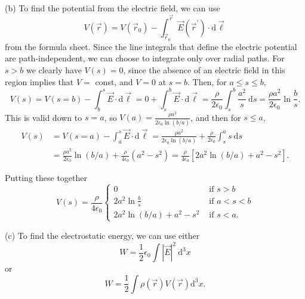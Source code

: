 \documentclass[12pt]{article}
\begin{document}
(b) To find the potential from the electric field, we can use
\[
V(\vec{r})=V\left(\vec{r}_0\right)-\int_{\vec{r}_0}^{\vec{r}} \vec{E}\left(\vec{r}^{\prime}\right) \cdot \mathrm{d} \vec{\ell}
\]
from the formula sheet. Since the line integrals that define the electric potential are path-independent, we can choose to integrate only over radial paths. For \(s>b\) we clearly have \(V(s)=0\), since the absence of an electric field in this region implies that \(V=\) const, and \(V=0\) at \(s=b\). Then, for \(a \leq s \leq b\),
\[
V(s)=V(s=b)-\int_b^s \vec{E} \cdot \mathrm{d} \vec{\ell}=0+\int_s^b \vec{E} \cdot \mathrm{d} \vec{\ell}=\frac{\rho}{2 \epsilon_0} \int_s^b \frac{a^2}{s} \mathrm{~d} s=\frac{\rho a^2}{2 \epsilon_0} \ln \frac{b}{s} .
\]
This is valid down to \(s=a\), so \(V(a)=\frac{\rho a^2}{2 \epsilon_0 \ln (b / a)}\), and then for \(s \leq a\),
\[
\begin{aligned}
V(s) & =V(s=a)-\int_a^s \vec{E} \cdot \mathrm{d} \vec{\ell}=\frac{\rho a^2}{2 \epsilon_0 \ln (b / a)}+\frac{\rho}{2 \epsilon_0} \int_s^a s \mathrm{~d} s \\
& =\frac{\rho a^2}{2 \epsilon_0} \ln (b / a)+\frac{\rho}{4 \epsilon_0}\left(a^2-s^2\right)=\frac{\rho}{4 \epsilon_0}\left[2 a^2 \ln (b / a)+a^2-s^2\right] .
\end{aligned}
\]

Putting these together
\[
V(s)=\frac{\rho}{4 \epsilon_0} \begin{cases}0 & \text { if } s>b \\ 2 a^2 \ln \frac{b}{s} & \text { if } a<s<b \\ 2 a^2 \ln (b / a)+a^2-s^2 & \text { if } s<a .\end{cases}
\]


(c) To find the electrostatic energy, we can use either
\[
W=\frac{1}{2} \epsilon_0 \int|\vec{E}|^2 \mathrm{~d}^3 x
\]
or
\[
W=\frac{1}{2} \int \rho(\vec{r}) V(\vec{r}) \mathrm{d}^3 x .
\]
\end{document}

